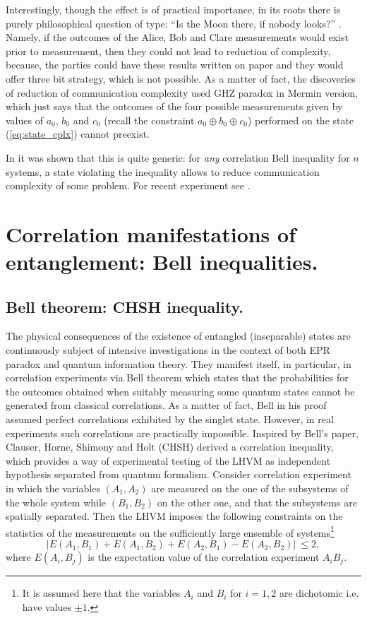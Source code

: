 \documentclass[rmp,12pt,preprint]{revtex4-2}
\begin{document}
Interestingly, though the effect is of practical importance, in its
roots there is purely philosophical question of type: ``Is the Moon
there, if nobody looks?'' \cite{MerminMoon}. Namely, if the outcomes
of the Alice, Bob and Clare measurements would exist prior to
measurement, then they could not lead to reduction of complexity,
because, the parties could have these results written on paper and
they would offer three bit strategy, which is not possible. As a
matter of fact, the discoveries of reduction of communication
complexity used GHZ paradox in Mermin version, which just says that
the outcomes of the four possible measurements given by values of
$a_0$, $b_0$ and $c_0$ (recall the constraint $a_0 \oplus b_0 \oplus
c_0$) performed on the state (\ref{eq:state_cplx}) cannot preexist.

In \cite{BruknerZPZ2002-Bell-complexity} it was shown that this is
quite generic: for {\it any} correlation Bell inequality
for $n$ systems,  a state violating the inequality allows to reduce
communication complexity of some problem. For recent experiment see
\cite{Exper_cplx}.



\section{Correlation manifestations of entanglement: Bell inequalities.}
\label{sec:Bell}

\subsection {Bell theorem: CHSH inequality.}

The physical consequences of the existence of entangled (inseparable)
states are continuously subject of intensive investigations in the
context of both EPR paradox and quantum information theory. They
manifest itself, in particular, in correlation experiments via Bell
theorem which states that the probabilities for the outcomes obtained
when suitably measuring some quantum states cannot be generated from
classical correlations. As a matter of fact, Bell in his proof assumed
perfect correlations exhibited by the singlet state. However, in real
experiments such correlations are practically impossible. Inspired by
Bell's paper, Clauser, Horne, Shimony and Holt (CHSH) \cite {CHSH}
derived a correlation inequality, which provides a way of experimental
testing of the LHVM as independent hypothesis separated from quantum
formalism. Consider correlation experiment in which the variables
$({A}_1,{A}_2)$ are measured on the one of the subsystems of the whole
system while $({ B}_1,{B}_2)$ on the other one, and that the
subsystems are spatially separated. Then the LHVM imposes the
following constraints on the statistics of the measurements on the
sufficiently large ensemble of systems\footnote{It is assumed here
  that the variables $A_i$ and $B_i$ for $i=1,2$ are dichotomic
  i.e. have values $\pm 1$.}
\begin{equation}
|E(A_1,B_1)+E(A_1,B_2)+E(A_2,B_1)-E(A_2,B_2)|\ \leq 2, \label{trzy}
\end{equation}
where $E(A_i,B_j)$ is the expectation value of the correlation
experiment $A_iB_j$.
\end{document}
